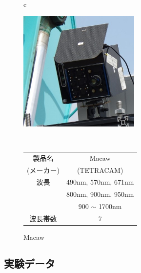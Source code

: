\begin{figure}[p]
	\begin{center}
		\begin{tabular}{c}

			\begin{minipage}[t]{\linewidth}
			\hspace{4cm}\includegraphics[width=6cm]{./Ch4_WaterContentEstimation/Fig/multispectral_camera.jpg}
			\caption{Macaw}\label{fig:multispectral_camera}
			\vspace{2cm}
			\end{minipage}

			\\

			\begin{minipage}[b]{\linewidth}

			\label{tbl:multispectral_camera}

				\hspace{4cm} \begin{tabular}{|c|c|} \hline %
				製品名 & Macaw \\
				(メーカー) & (TETRACAM) \\ \hline
				波長 & 490nm, 570nm, 671nm \\ 
				     & 800nm, 900nm, 950nm \\
				     & 900 $\sim$ 1700nm \\ \hline
				波長帯数 & 7 \\ \hline
				\end{tabular}
			\end{minipage}

		\end{tabular}
	\end{center}
\end{figure}
 
\clearpage

\subsection{実験データ}
\label{ssec:EstimationExperimentalProcedure}

